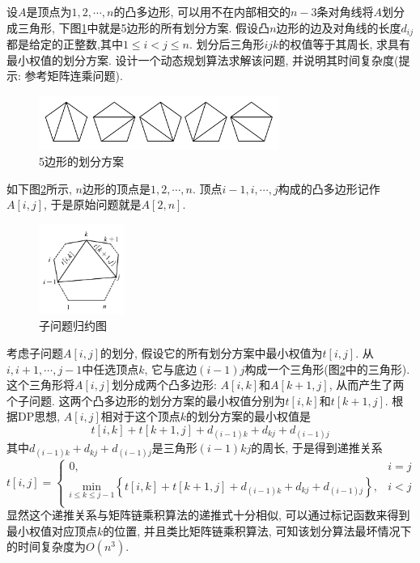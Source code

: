\documentclass{article}
\begin{document}
\begin{homeworkProblem}
	设$A$是顶点为$1,2,\cdots,n$的凸多边形, 可以用不在内部相交的$n-3$条对角线将$A$划分成三角形, 下图\ref{fig:5边形的划分方案}中就是5边形的所有划分方案. 假设凸$n$边形的边及对角线的长度$d_{ij}$都是给定的正整数,其中$1\leq i<j\leq n$. 划分后三角形$ijk$的权值等于其周长, 求具有最小权值的划分方案. 设计一个动态规划算法求解该问题, 并说明其时间复杂度(提示: 参考矩阵连乘问题).
	\begin{figure}[H]
		\centering
		\includegraphics[width=0.7\textwidth]{images/title/5边形的划分方案.pdf}
		\caption{5边形的划分方案}
		\label{fig:5边形的划分方案}
	\end{figure}
	如下图\ref{fig:子问题归约}所示, $n$边形的顶点是$1,2,\cdots,n$. 顶点$i-1,i,\cdots,j$构成的凸多边形记作$A[i,j]$, 于是原始问题就是$A[2,n]$.
	\begin{figure}[H]
		\centering
		\includegraphics[width=0.25\textwidth]{images/title/子问题归约.pdf}
		\caption{子问题归约图}
		\label{fig:子问题归约}
	\end{figure}
	考虑子问题$A[i,j]$的划分, 假设它的所有划分方案中最小权值为$t[i,j]$. 从$i,i+1,\cdots,j-1$中任选顶点$k$, 它与底边$(i-1)j$构成一个三角形(图\ref{fig:子问题归约}中的三角形). 这个三角形将$A[i,j]$划分成两个凸多边形: $A[i,k]$和$A[k+1,j]$, 从而产生了两个子问题. 这两个凸多边形的划分方案的最小权值分别为$t[i,k]$和$t[k+1,j]$. 根据DP思想, $A[i,j]$相对于这个顶点$k$的划分方案的最小权值是
	$$
	t\left[ i,k \right] +t\left[ k+1,j \right] +d_{\left( i-1 \right) k}+d_{kj}+d_{\left( i-1 \right) j}
	$$
	其中$d_{\left( i-1 \right) k}+d_{kj}+d_{\left( i-1 \right) j}$是三角形$(i-1)kj$的周长, 于是得到递推关系
	$$
	t\left[ i,j \right] =\begin{cases}
		0,&		i=j\\
		\underset{i\le k\le j-1}{\text{min}}\left\{ t\left[ i,k \right] +t\left[ k+1,j \right] +d_{\left( i-1 \right) k}+d_{kj}+d_{\left( i-1 \right) j} \right\} ,&		i<j\\
	\end{cases}
	$$
	显然这个递推关系与矩阵链乘积算法的递推式十分相似, 可以通过标记函数来得到最小权值对应顶点$k$的位置, 并且类比矩阵链乘积算法, 可知该划分算法最坏情况下的时间复杂度为$O\left( n^3 \right)$.
\end{homeworkProblem}
\end{document}
